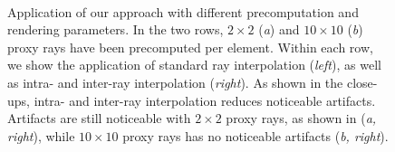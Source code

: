 \documentclass[review,journal]{vgtc}         %
\begin{document}
\begin{figure}[t]
    \centering
    \\
    \caption{Application of our approach with different precomputation and rendering parameters. In the two rows, $2 \times 2$ ({\it a}) and $10 \times 10$ ({\it b}) proxy rays have been precomputed per element. Within each row, we show the application of standard ray interpolation ({\it left}), as well as intra- and inter-ray interpolation ({\it right}). As shown in the close-ups, intra- and inter-ray interpolation reduces noticeable artifacts. Artifacts are still noticeable with $2 \times 2$ proxy rays, as shown in ({\it a, \it right}), while $10 \times 10$ proxy rays has no noticeable artifacts ({\it b, \it right}).}
    \label{fig:rayinterpolation}
\end{figure}
\end{document}
